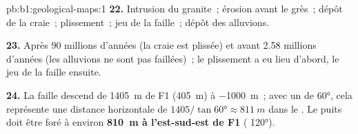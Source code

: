 \begin{solution}{pb:b1:geological-maps:1}
\textbf{22.} Intrusion du granite~; érosion avant le grès~; dépôt de la craie~;
plissement~; jeu de la faille~; dépôt des alluvions.

\textbf{23.} Après 90 millions d'années (la craie est plissée) et avant
2.58 millions d'années (les alluvions ne sont pas faillées)~; le plissement a eu
lieu d'abord, le jeu de la faille ensuite.

\textbf{24.} La faille descend de \qty{1405}{m} de F1 (\qty{405}{m}) à
\qty{-1000}{m}~; avec un  de \ang{60}, cela représente une distance
horizontale de $1405/\tan\ang{60} \approx \qty{811}{m}$ dans le .
Le puits doit être foré à environ \textbf{\qty[text-series-to-math=true]{810}{m} à l'est-sud-est de F1} ( \ang{120}).
\end{solution}
